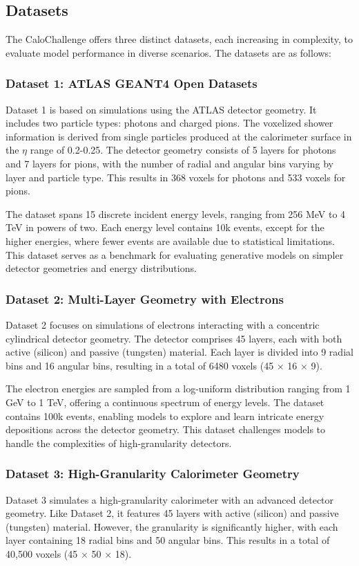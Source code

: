 \subsection{Datasets}

The CaloChallenge offers three distinct datasets, each increasing in complexity, to evaluate model performance in diverse scenarios. The datasets are as follows:

\subsubsection{Dataset 1: ATLAS GEANT4 Open Datasets}
Dataset 1 is based on simulations using the ATLAS detector geometry. It includes two particle types: photons and charged pions. The voxelized shower information is derived from single particles produced at the calorimeter surface in the $\eta$ range of 0.2-0.25. The detector geometry consists of 5 layers for photons and 7 layers for pions, with the number of radial and angular bins varying by layer and particle type. This results in 368 voxels for photons and 533 voxels for pions.

The dataset spans 15 discrete incident energy levels, ranging from 256 MeV to 4 TeV in powers of two. Each energy level contains 10k events, except for the higher energies, where fewer events are available due to statistical limitations. This dataset serves as a benchmark for evaluating generative models on simpler detector geometries and energy distributions.

\subsubsection{Dataset 2: Multi-Layer Geometry with Electrons}
Dataset 2 focuses on simulations of electrons interacting with a concentric cylindrical detector geometry. The detector comprises 45 layers, each with both active (silicon) and passive (tungsten) material. Each layer is divided into 9 radial bins and 16 angular bins, resulting in a total of 6480 voxels (45 $\times$ 16 $\times$ 9). 

The electron energies are sampled from a log-uniform distribution ranging from 1 GeV to 1 TeV, offering a continuous spectrum of energy levels. The dataset contains 100k events, enabling models to explore and learn intricate energy depositions across the detector geometry. This dataset challenges models to handle the complexities of high-granularity detectors.

\subsubsection{Dataset 3: High-Granularity Calorimeter Geometry}
Dataset 3 simulates a high-granularity calorimeter with an advanced detector geometry. Like Dataset 2, it features 45 layers with active (silicon) and passive (tungsten) material. However, the granularity is significantly higher, with each layer containing 18 radial bins and 50 angular bins. This results in a total of 40,500 voxels (45 $\times$ 50 $\times$ 18).

